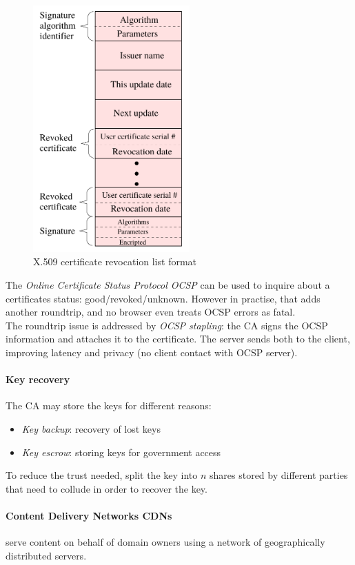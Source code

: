 \begin{figure}[h]
    \centering
    \includegraphics[width=6cm]{images/ch10-pki-crl.png}
    \caption{X.509 certificate revocation list format}
    \label{fig:pki-crl}
\end{figure}

The \emph{Online Certificate Status Protocol OCSP} can be used to inquire about a certificates status: good/revoked/unknown. However in practise, that adds another roundtrip, and no browser even treats OCSP errors as fatal. \\
The roundtrip issue is addressed by \emph{OCSP stapling}: the CA signs the OCSP information and attaches it to the certificate. The server sends both to the client, improving latency and privacy (no client contact with OCSP server).

\paragraph{Key recovery} The CA may store the keys for different reasons:
\begin{itemize}
    \item \emph{Key backup}: recovery of lost keys
    \item \emph{Key escrow}: storing keys for government access
\end{itemize}
To reduce the trust needed, split the key into $n$ shares stored by different parties that need to collude in order to recover the key.

\paragraph{Content Delivery Networks CDNs} serve content on behalf of domain owners using a network of geographically distributed servers.


